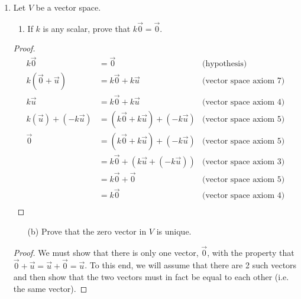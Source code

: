 \documentclass[12pt]{article}
\begin{document}
\begin{enumerate}
\begin{proof}
                      Therefore $W$ is a subspace of $F(-\infty, \infty)$ and hence is a vector space.
              \end{proof}
        \item
              Let $V$ be a vector space.
              \begin{enumerate}
                      \item If $k$ is any scalar, prove that $k\vec{0} = \vec{0}$.
              \end{enumerate}
              \begin{proof}
                      \begin{align*}
                              k\vec{0}                 & = \vec{0}                             & \textrm{(hypothesis)}           \\
                              k(\vec{0} + \vec{u})     & = k\vec{0} + k\vec{u}                 & \textrm{(vector space axiom 7)} \\
                              k\vec{u}                 & = k\vec{0} + k\vec{u}                 & \textrm{(vector space axiom 4)} \\
                              k(\vec{u}) + (-k\vec{u}) & = (k\vec{0} + k\vec{u}) + (-k\vec{u}) & \textrm{(vector space axiom 5)} \\
                              \vec{0}                  & = (k\vec{0} + k\vec{u}) + (-k\vec{u}) & \textrm{(vector space axiom 5)} \\
                                                       & = k\vec{0} + (k\vec{u} + (-k\vec{u})) & \textrm{(vector space axiom 3)} \\
                                                       & = k\vec{0} + \vec{0}                  & \textrm{(vector space axiom 5)} \\
                                                       & = k\vec{0}                            & \textrm{(vector space axiom 4)} \\
                      \end{align*}
              \end{proof}
              \begin{enumerate}
                      \item[(b)] Prove that the zero vector in $V$ is unique.
              \end{enumerate}
              \begin{proof}
                      We must show that there is only one vector, $\vec{0}$, with the property that \\
                      $\vec{0} + \vec{u} = \vec{u} + \vec{0} = \vec{u}$. To this end,
                      we will assume that there are 2 such vectors and then show that the two vectors
                      must in fact be equal to each other (i.e. the same vector).


\end{proof}
\end{enumerate}
\end{document}
